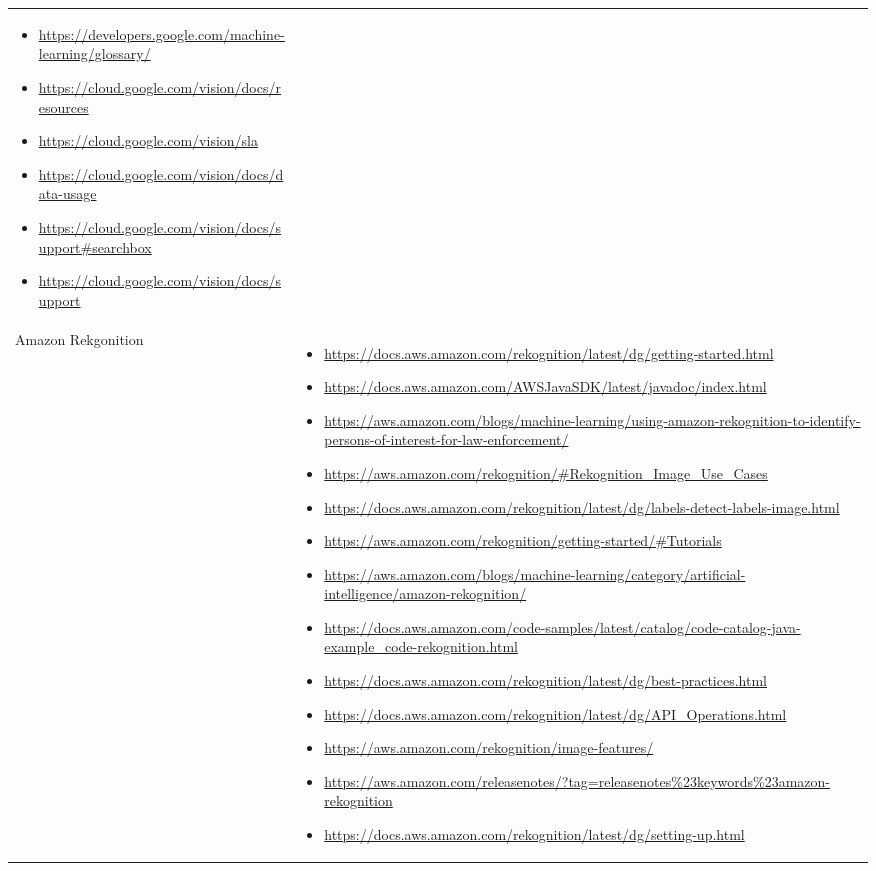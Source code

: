 {\begin{longtable}{p{.2\linewidth}|p{.725\linewidth}}
\begin{itemize}[label=,leftmargin=10pt,topsep=0pt,partopsep=0pt,noitemsep,nolistsep,itemindent=-10pt]
\item \url{https://developers.google.com/machine-learning/glossary/}
\item \url{https://cloud.google.com/vision/docs/resources}
\item \url{https://cloud.google.com/vision/sla}
\item \url{https://cloud.google.com/vision/docs/data-usage}
\item \url{https://cloud.google.com/vision/docs/support#searchbox}
\item \url{https://cloud.google.com/vision/docs/support}
    \end{itemize}\\
    Amazon Rekgonition &
    \vspace{-1.75mm}
    \begin{itemize}[label=,leftmargin=10pt,topsep=0pt,partopsep=0pt,noitemsep,nolistsep,itemindent=-10pt]
\item \url{https://docs.aws.amazon.com/rekognition/latest/dg/getting-started.html}
\item \url{https://docs.aws.amazon.com/AWSJavaSDK/latest/javadoc/index.html}
\item \url{https://aws.amazon.com/blogs/machine-learning/using-amazon-rekognition-to-identify-persons-of-interest-for-law-enforcement/}
\item \url{https://aws.amazon.com/rekognition/#Rekognition_Image_Use_Cases}
\item \url{https://docs.aws.amazon.com/rekognition/latest/dg/labels-detect-labels-image.html}
\item \url{https://aws.amazon.com/rekognition/getting-started/#Tutorials}
\item \url{https://aws.amazon.com/blogs/machine-learning/category/artificial-intelligence/amazon-rekognition/}
\item \url{https://docs.aws.amazon.com/code-samples/latest/catalog/code-catalog-java-example_code-rekognition.html}
\item \url{https://docs.aws.amazon.com/rekognition/latest/dg/best-practices.html}
\item \url{https://docs.aws.amazon.com/rekognition/latest/dg/API_Operations.html}
\item \url{https://aws.amazon.com/rekognition/image-features/}
\item \url{https://aws.amazon.com/releasenotes/?tag=releasenotes\%23keywords\%23amazon-rekognition}
\item \url{https://docs.aws.amazon.com/rekognition/latest/dg/setting-up.html}

\end{itemize}
\end{longtable}}
